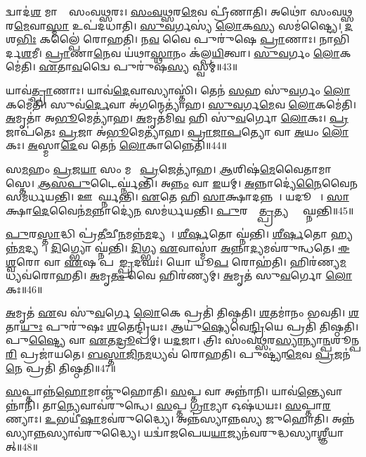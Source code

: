 𑌦𑍍𑌵𑌾𑌦॑\ul{𑌶} 𑌮𑌾𑌸𑌾𑌃᳚ 𑌸𑌂𑌵\ul{𑌥𑍍𑌸}𑌰𑌃।
\ul{𑌸𑌂}\ul{𑌵}\ul{𑌥𑍍𑌸}𑌰\ul{𑌮𑍇}𑌵 𑌪𑍍𑌰𑍀॑𑌣𑌾𑌤𑌿।
𑌅𑌥𑍋॑ 𑌸𑌂𑌵\ul{𑌥𑍍𑌸}𑌰\ul{𑌮𑍇}𑌵𑌾\ul{𑌸𑍍𑌮𑌾} 𑌉𑌪॑𑌦𑌧𑌾𑌤𑌿।
\ul{𑌸𑍁}\ul{𑌵}𑌰𑍍𑌗𑌸𑍍𑌯॑ \ul{𑌲𑍋}𑌕\ul{𑌸𑍍𑌯} 𑌸𑌮॑𑌷𑍍𑌟𑍍𑌯𑍈।
\ul{𑌦}𑌶\ul{𑌭𑌿𑌃} 𑌕𑌲𑍍𑌪𑍈॑ 𑌰𑍋𑌹𑌤𑌿।
𑌨\ul{𑌵} 𑌵𑍈 𑌪𑍁𑌰𑍁॑𑌷𑍇 \ul{𑌪𑍍𑌰𑌾}𑌣𑌾𑌃।
𑌨𑌾𑌭𑌿॑𑌰𑍍𑌦\ul{𑌶}𑌮𑍀।
\ul{𑌪𑍍𑌰𑌾}𑌣𑌾\ul{𑌨𑍇}𑌵 𑌯॑𑌥𑌾\ul{𑌸𑍍𑌥𑌾}𑌨𑌂 𑌕॑𑌲𑍍𑌪\ul{𑌯𑌿}𑌤𑍍𑌵𑌾।
\ul{𑌸𑍁}\ul{𑌵}𑌰𑍍𑌗𑌂 \ul{𑌲𑍋}𑌕𑌮𑍇॑𑌤𑌿।
\ul{𑌏}𑌤𑌾\ul{𑌵}𑌦𑍍𑌵𑍈 𑌪𑍁𑌰𑍁॑𑌷\ul{𑌸𑍍𑌯} 𑌸𑍍𑌵𑌮𑍍॥43॥

𑌯𑌾𑌵॑\ul{𑌤𑍍𑌪𑍍𑌰𑌾}𑌣𑌾𑌃।
𑌯𑌾𑌵॑\ul{𑌦𑍇}𑌵𑌾𑌸𑍍𑌯𑌾𑌸𑍍𑌤𑌿॑।
𑌤𑍇𑌨॑ \ul{𑌸}𑌹 𑌸𑍁॑\ul{𑌵}𑌰𑍍𑌗𑌂 \ul{𑌲𑍋}𑌕𑌮𑍇॑𑌤𑌿।
𑌸𑍁𑌵॑\ul{𑌰𑍍𑌦𑍇}𑌵𑌾 𑌅॑\ul{𑌗}𑌨𑍍𑌮𑍇𑌤𑍍𑌯𑌾॑𑌹।
\ul{𑌸𑍁}\ul{𑌵}𑌰𑍍𑌗\ul{𑌮𑍇}𑌵 \ul{𑌲𑍋}𑌕𑌮𑍇॑𑌤𑌿।
\ul{𑌅}𑌮𑍃𑌤𑌾॑ 𑌅\ul{𑌭𑍂}𑌮𑍇𑌤𑍍𑌯𑌾॑𑌹।
\ul{𑌅}𑌮𑍃𑌤॑𑌮𑌿\ul{𑌵} 𑌹𑌿 𑌸𑍁॑\ul{𑌵}𑌰𑍍𑌗𑍋 \ul{𑌲𑍋}𑌕𑌃।
\ul{𑌪𑍍𑌰}𑌜𑌾𑌪॑𑌤𑍇𑌃 \ul{𑌪𑍍𑌰}𑌜𑌾 𑌅॑\ul{𑌭𑍂}𑌮𑍇𑌤𑍍𑌯𑌾॑𑌹।
\ul{𑌪𑍍𑌰𑌾}\ul{𑌜𑌾}\ul{𑌪}𑌤𑍍𑌯𑍋 𑌵𑌾 \ul{𑌅}𑌯𑌂 \ul{𑌲𑍋}𑌕𑌃।
\ul{𑌅}𑌸𑍍𑌮𑌾\ul{𑌦𑍇}𑌵 𑌤𑍇𑌨॑ \ul{𑌲𑍋}𑌕𑌾𑌨𑍍𑌨𑍈𑌤𑌿॑॥44॥

𑌸\ul{𑌮}𑌹𑌂 \ul{𑌪𑍍𑌰}𑌜\ul{𑌯𑌾} 𑌸𑌂 𑌮𑌯𑌾᳚ \ul{𑌪𑍍𑌰}𑌜𑍇𑌤𑍍𑌯𑌾॑𑌹।
\ul{𑌆}𑌶𑌿𑌷॑\ul{𑌮𑍇}𑌵𑍈𑌤𑌾𑌮𑌾 𑌶𑌾᳚𑌸𑍍𑌤𑍇।
\ul{𑌆}\ul{𑌸}\ul{𑌪𑍁}𑌟𑍈𑌰𑍍𑌘𑍍𑌨॑𑌨𑍍𑌤𑌿।
𑌅\ul{𑌨𑍍𑌨𑌂} 𑌵𑌾 \ul{𑌇}𑌯𑌮𑍍।
\ul{𑌅}𑌨𑍍𑌨𑌾𑌦𑍍𑌯𑍇॑\ul{𑌨𑍈}𑌵𑍈\ul{𑌨}\ul{} 𑌸𑌮॑𑌰𑍍𑌧𑌯𑌨𑍍𑌤𑌿।
𑌊𑌷𑍈᳚𑌰𑍍𑌘𑍍𑌨𑌨𑍍𑌤𑌿।
\ul{𑌏}𑌤𑍇 𑌹𑌿 \ul{𑌸𑌾}𑌕𑍍𑌷𑌾𑌦𑌨𑍍𑌨𑌮𑍍᳚।
𑌯𑌦𑍂𑌷𑌾𑌃᳚।
\ul{𑌸𑌾}𑌕𑍍𑌷𑌾\ul{𑌦𑍇}𑌵𑍈𑌨॑\ul{𑌮}𑌨𑍍𑌨𑌾𑌦𑍍𑌯𑍇॑\ul{𑌨} 𑌸𑌮॑𑌰𑍍𑌧𑌯𑌨𑍍𑌤𑌿।
\ul{𑌪𑍁}𑌰𑌸𑍍𑌤𑌾᳚\ul{𑌤𑍍𑌪𑍍𑌰}𑌤𑍍𑌯𑌞𑍍𑌚𑌂᳚ 𑌘𑍍𑌨𑌨𑍍𑌤𑌿॥45॥

\ul{𑌪𑍁}𑌰\ul{𑌸𑍍𑌤𑌾}𑌦𑍍𑌧𑌿 𑌪𑍍𑌰॑\ul{𑌤𑍀}𑌚𑍀\ul{𑌨}𑌮𑌨𑍍𑌨॑\ul{𑌮}𑌦𑍍𑌯𑌤𑍇᳚।
\ul{𑌶𑍀}\ul{𑌰𑍍}\ul{𑌷}𑌤𑍋 𑌘𑍍𑌨॑𑌨𑍍𑌤𑌿।
\ul{𑌶𑍀}\ul{𑌰𑍍}\ul{𑌷}𑌤𑍋 𑌹𑍍𑌯𑌨𑍍𑌨॑\ul{𑌮}𑌦𑍍𑌯𑌤𑍇᳚।
\ul{𑌦𑌿}𑌗𑍍𑌭𑍍𑌯𑍋 𑌘𑍍𑌨॑𑌨𑍍𑌤𑌿।
\ul{𑌦𑌿}𑌗𑍍𑌭𑍍𑌯 \ul{𑌏}𑌵𑌾𑌸𑍍𑌮𑌾॑ \ul{𑌅}𑌨𑍍𑌨𑌾\ul{𑌦𑍍𑌯}𑌮𑌵॑𑌰𑍁𑌨𑍍𑌧𑌤𑍇।
\ul{𑌈}\ul{𑌶𑍍𑌵}𑌰𑍋 𑌵𑌾 \ul{𑌏}𑌷 𑌪𑌰𑌾᳚\ul{𑌙𑍍𑌪𑍍𑌰}𑌦𑌘𑌃॑।
𑌯𑍋 𑌯𑍂\ul{𑌪}\ul{} 𑌰𑍋𑌹॑𑌤𑌿।
𑌹𑌿𑌰॑𑌣𑍍𑌯\ul{𑌮}𑌧𑍍𑌯𑌵॑𑌰𑍋𑌹𑌤𑌿।
\ul{𑌅}𑌮𑍃\ul{𑌤𑌂} 𑌵𑍈 𑌹𑌿𑌰॑𑌣𑍍𑌯𑌮𑍍।
\ul{𑌅}𑌮𑍃𑌤॑ 𑌸𑍁\ul{𑌵}𑌰𑍍𑌗𑍋 \ul{𑌲𑍋}𑌕𑌃॥46॥

\ul{𑌅}𑌮𑍃𑌤॑ \ul{𑌏}𑌵 𑌸𑍁॑\ul{𑌵}𑌰𑍍𑌗𑍇 \ul{𑌲𑍋}𑌕𑍇 𑌪𑍍𑌰𑌤𑌿॑ 𑌤𑌿𑌷𑍍𑌠𑌤𑌿।
\ul{𑌶}𑌤𑌮𑌾॑𑌨𑌂 𑌭𑌵𑌤𑌿।
\ul{𑌶}𑌤𑌾\ul{𑌯𑍁𑌃} 𑌪𑍁𑌰𑍁॑𑌷𑌃 \ul{𑌶}𑌤𑍇𑌨𑍍𑌦𑍍𑌰𑌿॑𑌯𑌃।
𑌆𑌯𑍁॑\ul{𑌷𑍍𑌯𑍇}𑌵𑍇\ul{𑌨𑍍𑌦𑍍𑌰𑌿}𑌯𑍇 𑌪𑍍𑌰𑌤𑌿॑ 𑌤𑌿𑌷𑍍𑌠𑌤𑌿।
𑌪𑍁\ul{𑌷𑍍𑌟𑍍𑌯𑍈} 𑌵𑌾 \ul{𑌏}𑌤\ul{𑌦𑍍𑌰𑍂}𑌪𑌮𑍍।
𑌯\ul{𑌦}𑌜𑌾।
𑌤𑍍𑌰𑌿𑌃 𑌸𑌂॑𑌵\ul{𑌥𑍍𑌸}𑌰\ul{𑌸𑍍𑌯𑌾}𑌨𑍍𑌯𑌾\ul{𑌨𑍍𑌪}𑌶𑍂𑌨𑍍𑌪\ul{𑌰𑌿} 𑌪𑍍𑌰𑌜𑌾॑𑌯𑌤𑍇।
\ul{𑌬}\ul{𑌸𑍍𑌤𑌾}\ul{𑌜𑌿}𑌨\ul{𑌮}𑌧𑍍𑌯𑌵॑ 𑌰𑍋𑌹𑌤𑌿।
𑌪𑍁𑌷𑍍𑌟𑍍𑌯𑌾॑\ul{𑌮𑍇}𑌵 \ul{𑌪𑍍𑌰}𑌜𑌨॑\ul{𑌨𑍇} 𑌪𑍍𑌰𑌤𑌿॑ 𑌤𑌿𑌷𑍍𑌠𑌤𑌿॥47॥\anuvakamend[\ul{𑌪}\ul{𑌰𑌿}\ul{𑌧𑌾}𑌪𑌯॑𑌤𑌿 \ul{𑌗𑍋}𑌧𑍂𑌮𑌾॑ 𑌜𑍁𑌹𑍋\ul{𑌤𑌿} 𑌸𑍍𑌵𑌂 𑌨𑍈𑌤𑌿॑ \ul{𑌪𑍍𑌰}𑌤𑍍𑌯𑌞𑍍𑌚𑌂᳚ 𑌘𑍍𑌨𑌨𑍍𑌤𑌿 \ul{𑌲𑍋}𑌕𑍋 𑌨𑌵॑ 𑌚]

\ul{𑌸}𑌪𑍍𑌤𑌾𑌨𑍍𑌨॑\ul{𑌹𑍋}𑌮𑌾𑌞𑍍𑌜𑍁॑𑌹𑍋𑌤𑌿।
\ul{𑌸}𑌪𑍍𑌤 𑌵𑌾 𑌅𑌨𑍍𑌨𑌾॑𑌨𑌿।
𑌯𑌾𑌵॑\ul{𑌨𑍍𑌤𑍍𑌯𑍇}𑌵𑌾𑌨𑍍𑌨𑌾॑𑌨𑌿।
𑌤𑌾\ul{𑌨𑍍𑌯𑍇}𑌵𑌾𑌵॑𑌰𑍁𑌨𑍍𑌧𑍇।
\ul{𑌸}𑌪𑍍𑌤 \ul{𑌗𑍍𑌰𑌾}𑌮𑍍𑌯𑌾 𑌓𑌷॑𑌧𑌯𑌃।
\ul{𑌸}𑌪𑍍𑌤𑌾\ul{𑌰}𑌣𑍍𑌯𑌾𑌃।
\ul{𑌉}𑌭𑌯𑍀॑\ul{𑌷𑌾}𑌮𑌵॑𑌰𑍁𑌦𑍍𑌧𑍍𑌯𑍈।
𑌅𑌨𑍍𑌨॑𑌸𑍍𑌯𑌾𑌨𑍍𑌨𑌸𑍍𑌯 𑌜𑍁𑌹𑍋𑌤𑌿।
𑌅𑌨𑍍𑌨॑𑌸𑍍𑌯𑌾\ul{𑌨𑍍𑌨}𑌸𑍍𑌯𑌾\-𑌵॑𑌰𑍁𑌦𑍍𑌧𑍍𑌯𑍈।
𑌯𑌦𑍍𑌵𑌾॑𑌜𑌪𑍇𑌯\ul{𑌯𑌾}𑌜𑍍𑌯𑌨॑𑌵𑌰𑍁𑌦𑍍𑌧𑌸𑍍𑌯𑌾\ul{𑌶𑍍𑌞𑍀}𑌯𑌾𑌤𑍍॥48॥

